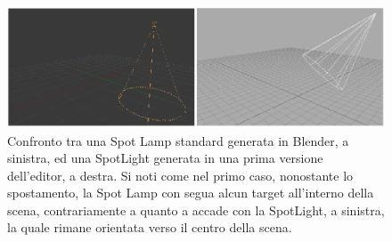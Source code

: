 \begin{figure}[h]
 \centering
 \includegraphics[width=1\linewidth]{images/chapter_creazione_scena/editor_5.png}\hfill
 \caption[Confronto luci]{Confronto tra una Spot Lamp standard generata in Blender, a sinistra, ed una SpotLight generata in una prima versione dell'editor, a destra. Si noti come nel primo caso, nonostante lo spostamento, la Spot Lamp con segua alcun target all'interno della scena, contrariamente a quanto a accade con la SpotLight, a sinistra, la quale rimane orientata verso il centro della scena.}
 \label{fig:editor_5}
\end{figure} 

